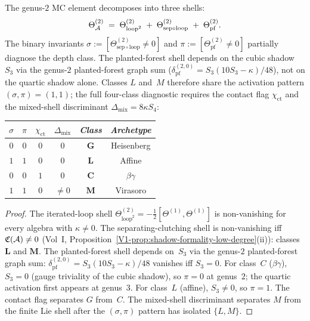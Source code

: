 \begin{theorem}
\ClaimStatusProvedHere
{}
The genus-$2$ MC element decomposes into three shells:
\begin{equation}%
\Theta_\cA^{(2)}
\;=\;
\Theta^{(2)}_{\mathrm{loop}^2}
\;+\;
\Theta^{(2)}_{\mathrm{sep}\circ\mathrm{loop}}
\;+\;
\Theta^{(2)}_{\mathrm{pf}}.
\end{equation}
The binary invariants
$\sigma := [\Theta^{(2)}_{\mathrm{sep}\circ\mathrm{loop}} \neq 0]$
and
$\pi := [\Theta^{(2)}_{\mathrm{pf}} \neq 0]$
partially diagnose the depth class. The planted-forest shell
depends on the cubic shadow~$S_3$ via the genus-$2$ planted-forest
graph sum ($\delta_{\mathrm{pf}}^{(2,0)} = S_3(10S_3 - \kappa)/48$),
not on the quartic shadow alone. Classes $L$ and~$M$ therefore share
the activation pattern $(\sigma, \pi) = (1,1)$; the full four-class
diagnostic requires the contact flag $\chi_{\mathrm{ct}}$ and the
mixed-shell discriminant $\Delta_{\mathrm{mix}} = 8\kappa S_4$:
\begin{center}
\small
\renewcommand{\arraystretch}{1.15}
\begin{tabular}{cccccc}
\toprule
$\sigma$ & $\pi$ & $\chi_{\mathrm{ct}}$ & $\Delta_{\mathrm{mix}}$ & \emph{Class} & \emph{Archetype} \\
\midrule
$0$ & $0$ & $0$ & $0$ & $\mathbf{G}$ & Heisenberg \\
$1$ & $1$ & $0$ & $0$ & $\mathbf{L}$ & Affine \\
$0$ & $0$ & $1$ & $0$ & $\mathbf{C}$ & $\beta\gamma$ \\
$1$ & $1$ & $0$ & $\neq 0$ & $\mathbf{M}$ & Virasoro \\
\bottomrule
\end{tabular}
\end{center}
\end{theorem}

\begin{proof}
The iterated-loop shell
$\Theta^{(2)}_{\mathrm{loop}^2} =
-\frac{1}{2}[\Theta^{(1)}, \Theta^{(1)}]$
is non-vanishing for every algebra with $\kappa \neq 0$.
The separating-clutching shell is non-vanishing iff
$\mathfrak{C}(\mathcal{A}) \neq 0$
\textup{(}Vol~I, Proposition~\textup{\ref*{V1-prop:shadow-formality-low-degree}(ii)}\textup{)}:
classes $\mathbf{L}$ and $\mathbf{M}$.
The planted-forest shell depends on~$S_3$ via the genus-$2$
planted-forest graph sum: $\delta_{\mathrm{pf}}^{(2,0)}
= S_3(10S_3 - \kappa)/48$ vanishes iff $S_3 = 0$.
For class~$C$ ($\beta\gamma$), $S_3 = 0$ (gauge triviality of
the cubic shadow), so $\pi = 0$ at genus~$2$; the quartic
activation first appears at genus~$3$. For class~$L$ (affine),
$S_3 \neq 0$, so $\pi = 1$. The contact flag separates $G$
from~$C$. The mixed-shell discriminant separates $M$ from the
finite Lie shell after the $(\sigma,\pi)$ pattern has isolated
$\{L,M\}$.
\end{proof}


